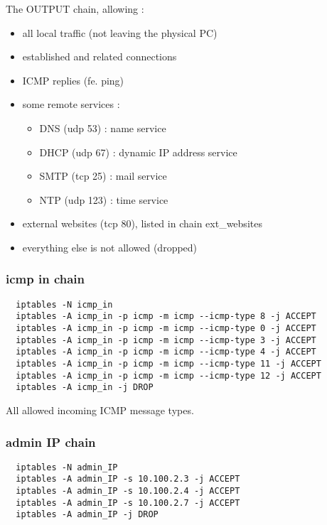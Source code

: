\documentclass[a4paper,12pt]{article}
\begin{document}
The OUTPUT chain, allowing :
\begin{itemize}
  \item all local traffic (not leaving the physical PC)
  \item established and related connections
  \item ICMP replies (fe. ping)
  \item some remote services :
  \begin{itemize}
    \item DNS (udp 53) : name service
    \item DHCP (udp 67) : dynamic IP address service
    \item SMTP (tcp 25) : mail service
    \item NTP (udp 123) : time service
  \end{itemize}
  \item external websites (tcp 80), listed in chain ext\_websites
  \item everything else is not allowed (dropped)
\end{itemize}

\subsubsection{icmp in chain}

\begin{verbatim}
  iptables -N icmp_in
  iptables -A icmp_in -p icmp -m icmp --icmp-type 8 -j ACCEPT
  iptables -A icmp_in -p icmp -m icmp --icmp-type 0 -j ACCEPT
  iptables -A icmp_in -p icmp -m icmp --icmp-type 3 -j ACCEPT
  iptables -A icmp_in -p icmp -m icmp --icmp-type 4 -j ACCEPT
  iptables -A icmp_in -p icmp -m icmp --icmp-type 11 -j ACCEPT
  iptables -A icmp_in -p icmp -m icmp --icmp-type 12 -j ACCEPT
  iptables -A icmp_in -j DROP
\end{verbatim}

All allowed incoming ICMP message types.

\subsubsection{admin IP chain}

\begin{verbatim}
  iptables -N admin_IP
  iptables -A admin_IP -s 10.100.2.3 -j ACCEPT
  iptables -A admin_IP -s 10.100.2.4 -j ACCEPT
  iptables -A admin_IP -s 10.100.2.7 -j ACCEPT
  iptables -A admin_IP -j DROP
\end{verbatim}
\end{document}
